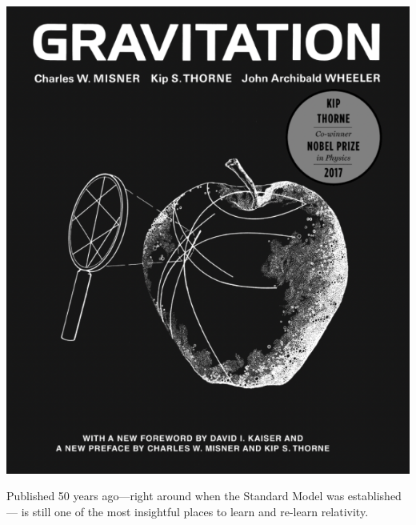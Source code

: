 \documentclass[12pt, oneside]{report}    %
\begin{document}
\begin{marginfigure}%
    \includegraphics[width=.8\textwidth]{figures/MSW_cover.png}
    \caption{Published 50 years ago---right around when the Standard Model was established--- is still one of the most insightful places to learn and re-learn relativity. }
    \label{fig:VSR:cover}
\end{marginfigure}
\end{document}
